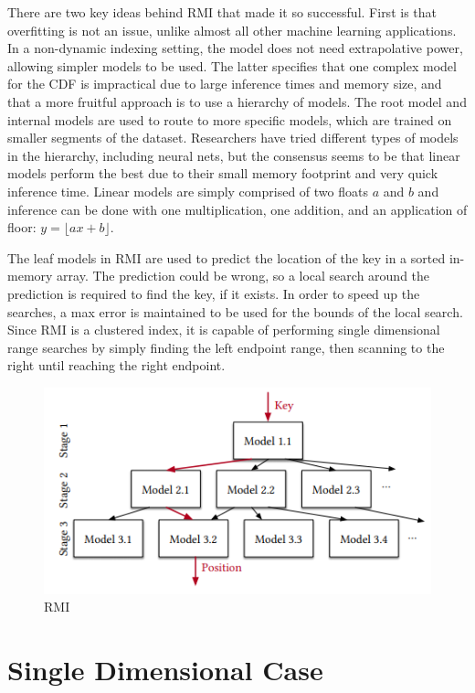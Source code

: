\documentclass[sigconf,10pt]{acmart}
\begin{document}
There are two key ideas behind RMI that made it so successful.
First is that overfitting is not an issue, unlike almost all other machine learning 
applications. In a non-dynamic indexing setting, the model does not need extrapolative
power, allowing simpler models to be used.
The latter specifies that one complex model for the CDF is impractical due to large inference times
and memory size, and that a more fruitful approach is to 
use a hierarchy of models. The root model and internal models are used to route
to more specific models, which are trained on smaller segments of the dataset. 
Researchers have tried different types of models in the hierarchy, including neural nets,
but the consensus seems to be that linear models perform the best due
to their small memory footprint and very quick inference time. %
Linear models are simply comprised of two floats $a$ and $b$ and inference
can be done with one multiplication, one addition, and an application of floor:
$y = \lfloor ax + b \rfloor$.

The leaf models in RMI are used to predict the location of the key in a sorted 
in-memory array. The prediction could be wrong, so a local search around the prediction
is required to find the key, if it exists. In order to speed up the searches,
a max error is maintained to be used for the bounds of the local search.
Since RMI is a clustered index, it is capable of performing single dimensional range searches
by simply finding the left endpoint range, then scanning to the right until reaching the right
endpoint.

\begin{figure}
  \includegraphics[scale=0.6]{../figures/RMI}
  \caption{RMI\cite{Learned_Index}}
  \label{RMI}
\end{figure}

\section{Single Dimensional Case}
\end{document}
